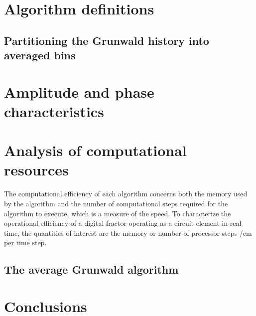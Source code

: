 \documentclass[twoside,reqno,11pt]{article}
\begin{document}

\section{Algorithm definitions}\label{sec:algorithmDefn}
\setcounter{section}{2}
\setcounter{equation}{0}

\vspace{-12pt}
\subsection{Partitioning the Grunwald history into averaged bins}\label{subsec:avgShift}



\section{Amplitude and phase characteristics}\label{sec:bode}
\setcounter{section}{3}
\setcounter{equation}{0}


\section{Analysis of computational resources}\label{sec:computation}
\setcounter{section}{4}
\setcounter{equation}{0}

The computational efficiency of each algorithm concerns both the
memory used by the algorithm and the number of computational steps
required for the algorithm to execute, which is a measure of the
speed. To characterize the operational efficiency of a digital fractor
operating as a circuit element in real time, the quantities of
interest are the memory or number of processor steps {/em per time
  step}.

\vspace{-12pt}
\subsection{The average Grunwald algorithm}



\section{Conclusions}\label{conclusions}
\setcounter{section}{5}
\setcounter{equation}{0}
\end{document}
